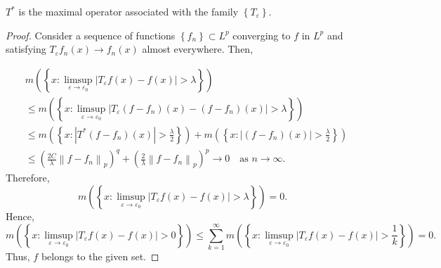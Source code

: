 \begin{rmk}
    $T^*$ is the maximal operator associated with the family $\left\{T_{\varepsilon}\right\}$.
\end{rmk}
\begin{proof}
    Consider a sequence of functions $\left\{f_n\right\} \subset L^p$ converging to $f$ in $L^p$ and satisfying $T_{\varepsilon} f_n(x) \rightarrow f_n(x)$ almost everywhere. Then,

$$\begin{aligned}
& m\left(\left\{x: \limsup _{\varepsilon \rightarrow \varepsilon_0}\left|T_{\varepsilon} f(x)-f(x)\right|>\lambda\right\}\right) \\
& \leqslant m\left(\left\{x:\limsup _{\varepsilon \rightarrow \varepsilon_0}\left|T_{\varepsilon}\left(f-f_n\right)(x)-\left(f-f_n\right)(x)\right|>\lambda\right\}\right) \\
& \leqslant m\left(\left\{x:\left|T^*\left(f-f_n\right)(x)\right|>\frac{\lambda}{2}\right\}\right) + m\left(\left\{x:\left|\left(f-f_n\right)(x)\right|>\frac{\lambda}{2}\right\}\right) \\
& \leqslant \left(\frac{2 C}{\lambda}\left\|f-f_n\right\|_p\right)^q + \left(\frac{2}{\lambda}\left\|f-f_n\right\|_p\right)^p \rightarrow 0 \quad \text{as } n \rightarrow \infty.
\end{aligned}$$
Therefore,
$$m\left(\left\{x: \limsup _{\varepsilon \rightarrow \varepsilon_0}\left|T_{\varepsilon} f(x)-f(x)\right|>\lambda\right\}\right) = 0.$$
Hence,
$$m\left(\left\{x: \limsup _{\varepsilon \rightarrow \varepsilon_0}\left|T_{\varepsilon} f(x)-f(x)\right|>0\right\}\right) \leqslant \sum_{k=1}^{\infty} m\left(\left\{x: \limsup _{\varepsilon \rightarrow \varepsilon_0}\left|T_{\varepsilon} f(x)-f(x)\right|>\frac{1}{k}\right\}\right) = 0.$$
Thus, $f$ belongs to the given set.
\end{proof}

